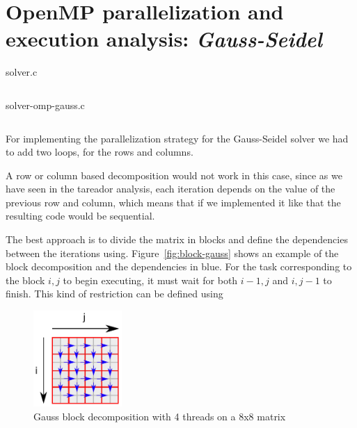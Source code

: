 
\pagebreak
\section{OpenMP parallelization and execution analysis: \emph{Gauss-Seidel}}

\begin{listing}[H]
    \caption{solver.c}%
    \label{lst:solver-omp-GS}
    \inputminted[firstline=44,lastline=66]{c}{code/solver-omp-orig.c}
\end{listing}

\begin{listing}[H]
    \caption{solver-omp-gauss.c}%
    \label{lst:solver-omp-gauss}
    \inputminted[firstline=57,lastline=89]{c}{code/solver-omp.c}
\end{listing}



For implementing the parallelization strategy for the Gauss-Seidel solver we had to add two loops, for the rows and columns.


A row or column based decomposition would not work in this case, since as we have seen in the
tareador analysis, each iteration depends on the value of the previous row and column,
which means that if we implemented it like that the resulting code would be sequential.

The best approach is to divide the matrix in blocks and define the dependencies between the
iterations using. Figure~\ref{fig:block-gauss} shows an example
of the block decomposition and the dependencies in blue. For the task corresponding to
the block $i,j$ to begin executing, it must wait for both $i-1, j$ and $i, j-1$ to finish.
This kind of restriction can be defined using \texttt{}


\begin{figure}[H]
    \centering
    \includegraphics[width=0.3\textwidth]{gauss_blocks}
    \caption{Gauss block decomposition with 4 threads on a 8x8 matrix}%
    \label{fig:blocks-gauss}
\end{figure}


